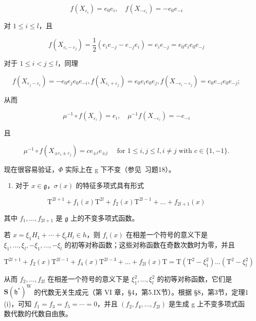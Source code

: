 \[
f (X _ {\varepsilon_ {i}}) = e _ {0} e _ {i}, \quad f (X _ {- \varepsilon_ {i}}) = - e _ {0} e _ {- i}
\]

对 \(1 \leq i \leq l\)，且

\[
f (X _ {\varepsilon_ {i} - \varepsilon_ {j}}) = \frac {1}{2} (e _ {i} e _ {- j} - e _ {- j} e _ {i}) = e _ {i} e _ {- j} = e _ {0} e _ {i} e _ {0} e _ {- j}
\]

对于 \(1 \leq i < j \leq l\)，同理

\[
f (X _ {\varepsilon_ {j} - \varepsilon_ {i}}) = - e _ {0} e _ {j} e _ {0} e _ {- i}, f (X _ {\varepsilon_ {i} + \varepsilon_ {j}}) = e _ {0} e _ {i} e _ {0} e _ {j}, f (X _ {- \varepsilon_ {i} - \varepsilon_ {j}}) = e _ {0} e _ {- i} e _ {0} e _ {- j};
\]

从而

\[
\mu^ {- 1} \circ f (X _ {\varepsilon_ {i}}) = e _ {i}, \quad \mu^ {- 1} f (X _ {- \varepsilon_ {i}}) = - e _ {- i}
\]

且

\[
\mu^ {- 1} \circ f (X _ {\pm \varepsilon_ {i} \pm \varepsilon_ {j}}) = c e _ {\pm i} e _ {\pm j} \quad \text {   for   } 1 \leq i, j \leq l, i \neq j \text {   with   } c \in \{1, - 1 \}.
\]

现在很容易验证，\(\Phi\) 实际上在 g 下不变（参见~习题18）。

\begin{enumerate}
\def\labelenumi{(\Roman{enumi})}
\setcounter{enumi}{5}
\tightlist
\item
对于 \(x \in \mathfrak{g}\)，\(\sigma(x)\) 的特征多项式具有形式
\end{enumerate}

\[
\mathrm{T} ^ {2 l + 1} + f _ {1} (x) \mathrm{T} ^ {2 l} + f _ {2} (x) \mathrm{T} ^ {2 l - 1} + \dots + f _ {2 l + 1} (x)
\]

其中 \(f_{1},\ldots ,f_{2l + 1}\) 是 \(\mathfrak{g}\) 上的不变多项式函数。

若 \(x = \xi_{1}H_{1} + \cdots + \xi_{l}H_{l} \in h\)，则 \(f_{i}(x)\) 在相差一个符号的意义下是 \(\xi_{1}, \ldots, \xi_{l}, -\xi_{1}, \ldots, -\xi_{l}\) 的初等对称函数；这些对称函数在奇数次数时为零，并且

\[
\mathrm{T} ^ {2 l + 1} + f _ {2} (x) \mathrm{T} ^ {2 l - 1} + f _ {4} (x) \mathrm{T} ^ {2 l - 3} + \dots + f _ {2 l} (x) \mathrm{T} = \mathrm{T} (\mathrm{T} ^ {2} - \xi_ {1} ^ {2}) \dots (\mathrm{T} ^ {2} - \xi_ {l} ^ {2})
\]

从而 \(f_{2},\ldots,f_{2l}\) 在相差一个符号的意义下是 \(\xi_{1}^{2},\ldots,\xi_{l}^{2}\) 的初等对称函数，它们是 \(\mathbf{S}(\mathfrak{h}^{*})^{\mathrm{W}}\) 的代数无关生成元（第 VI 章，§4，第5.IX节）。根据 §8，第3节，定理1 (i)，可知 \(f_{1}=f_{3}=f_{5}=\cdots=0\)，并且 \((f_{2},f_{4},\ldots,f_{2l})\) 是生成 g 上不变多项式函数代数的代数自由族。

